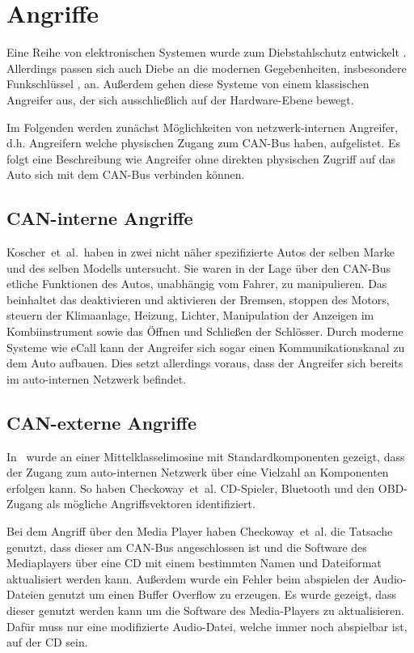 \chapter{Angriffe}\label{ch:attack}

Eine Reihe von elektronischen Systemen wurde zum Diebstahlschutz entwickelt
\cite{Song2008,Turner1999,Hwang1997}. Allerdings passen sich auch Diebe an die
modernen Gegebenheiten, insbesondere Funkschlüssel \cite{Lee2014}, an. Außerdem
gehen diese Systeme von einem klassischen Angreifer aus, der sich
ausschließlich auf der Hardware-Ebene bewegt.

Im Folgenden werden zunächst Möglichkeiten von netzwerk-internen Angreifer,
d.h. Angreifern welche physischen Zugang zum CAN-Bus haben, aufgelistet. Es
folgt eine Beschreibung wie Angreifer ohne direkten physischen Zugriff auf das
Auto sich mit dem CAN-Bus verbinden können.


\section{CAN-interne Angriffe}
Koscher~et~al.~haben in \cite{Koscher2010} zwei nicht näher spezifizierte Autos
der selben Marke und des selben Modells untersucht. Sie waren in der Lage über
den CAN-Bus etliche Funktionen des Autos, unabhängig vom Fahrer, zu
manipulieren. Das beinhaltet das deaktivieren und aktivieren der Bremsen,
stoppen des Motors, steuern der Klimaanlage, Heizung, Lichter, Manipulation der
Anzeigen im Kombiinstrument sowie das Öffnen und Schließen der Schlösser. Durch
moderne Systeme wie eCall kann der Angreifer sich sogar einen
Kommunikationskanal zu dem Auto aufbauen. Dies setzt allerdings voraus, dass
der Angreifer sich bereits im auto-internen Netzwerk befindet.

\section{CAN-externe Angriffe}
In~\cite{Checkoway2011} wurde an einer Mittelklasselimosine mit
Standardkomponenten gezeigt, dass der Zugang zum auto-internen Netzwerk über
eine Vielzahl an Komponenten erfolgen kann. So haben Checkoway~et~al.
CD-Spieler, Bluetooth und den OBD-Zugang als mögliche Angriffsvektoren
identifiziert.

Bei dem Angriff über den Media Player haben Checkoway~et~al. die Tatsache
genutzt, dass dieser am CAN-Bus angeschlossen ist und die Software des
Mediaplayers über eine CD mit einem bestimmten Namen und Dateiformat
aktualisiert werden kann. Außerdem wurde ein Fehler beim abspielen der
Audio-Dateien genutzt um einen Buffer Overflow zu erzeugen. Es wurde gezeigt,
dass dieser genutzt werden kann um die Software des Media-Players zu
aktualisieren. Dafür muss nur eine modifizierte Audio-Datei, welche immer noch
abspielbar ist, auf der CD sein.

